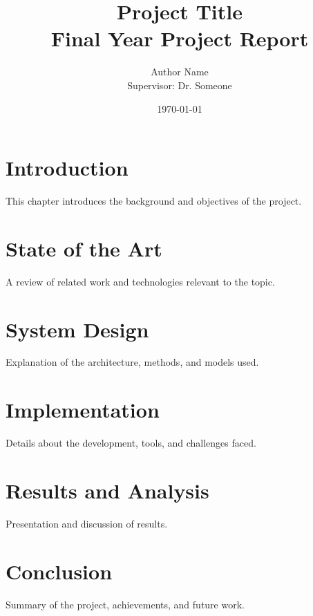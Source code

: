 \documentclass[12pt,a4paper]{report}
\title{\textbf{Project Title}\\\large Final Year Project Report}
\author{Author Name \\
Supervisor: Dr. Someone}
\date{\today}
\begin{document}
\maketitle
\thispagestyle{empty}
\clearpage

\tableofcontents
\clearpage


\chapter{Introduction}
This chapter introduces the background and objectives of the project.

\chapter{State of the Art}
A review of related work and technologies relevant to the topic.

\chapter{System Design}
Explanation of the architecture, methods, and models used.

\chapter{Implementation}
Details about the development, tools, and challenges faced.

\chapter{Results and Analysis}
Presentation and discussion of results.

\chapter{Conclusion}
Summary of the project, achievements, and future work.

\clearpage
{}


\end{document}
